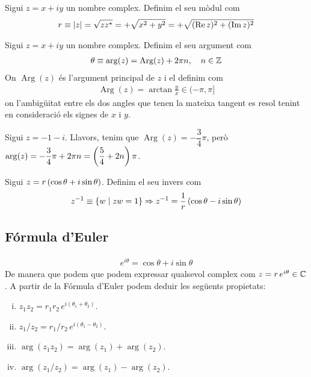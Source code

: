 \begin{defi}[Mòdul de $z$]
    Sigui $z = x + i y$ un nombre complex. Definim el seu mòdul com 
    \begin{align}
        r \equiv \left| z \right| = \sqrt{z z^{\star}} = +\sqrt{x^{2} + y^{2}} = + \sqrt{(\operatorname{Re} z)^{2} + (\operatorname{Im} z)^{2}}
    \end{align}
\end{defi}

\begin{defi}[Argument de $z$]
    Sigui $z = x + i y$ un nombre complex. Definim el seu argument com
    \begin{align}
        \theta \equiv \operatorname{arg}(z) = \operatorname{Arg} (z) + 2 \pi n, \quad n \in \mathbb{Z}
    \end{align}
    On $\operatorname{Arg} (z)$ és l'argument principal de $z$ i el definim com
    \begin{align}
        \operatorname{Arg} (z) = \arctan \frac{y}{x} \in (-\pi, \pi]
    \end{align}
    on l'ambigüitat entre els dos angles que tenen la mateixa tangent es resol tenint en consideració els signes de $x$ i $y$.
\end{defi}
\begin{example}
    Sigui $z = -1 -i$. Llavors, tenim que $\operatorname{Arg} (z) = -\dfrac{3}{4} \pi$, però $\operatorname{arg} (z) = -\dfrac{3}{4}\pi + 2\pi n = \left( \dfrac{5}{4} + 2n \right) \pi$.
\end{example}

\begin{defi}[Invers de $z$]
    Sigui $z = r \left( \cos \theta + i \sin \theta \right)$. Definim el seu invers com
    \begin{align}
        z^{-1} \equiv \left\{ w \mid zw = 1 \right\} \Rightarrow z^{-1} = \frac{1}{r} \left( \cos \theta - i \sin \theta \right)
    \end{align}
\end{defi}

\subsection{Fórmula d'Euler}
\begin{align}
    e^{i\theta} = \cos \theta + i \sin \theta
\end{align}
De manera que podem que podem expressar qualsevol complex com $z = r\,e^{i\theta} \in \mathbb{C}$. A partir de la Fórmula d'Euler podem deduir les següents propietats:
\begin{enumerate}[i)]
    \item $z_{1} z_{2} = r_{1}r_{2}\,e^{i(\theta_{1} + \theta_{2})}$.
    \item $z_{1} / z_{2} = r_{1}/r_{2}\,e^{i(\theta_{1} - \theta_{2})}$.
    \item $\operatorname{arg}(z_{1} z_{2}) = \operatorname{arg}(z_{1}) + \operatorname{arg}(z_{2})$.
    \item $\operatorname{arg}(z_{1} / z_{2}) = \operatorname{arg}(z_{1}) - \operatorname{arg}(z_{2})$.
\end{enumerate}


